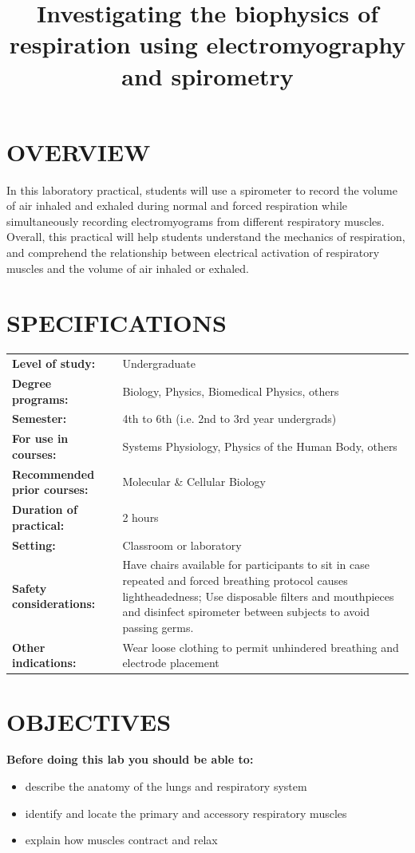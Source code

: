\documentclass[12pt]{article}
\title{\vspace{-1.8cm}\Large{\textbf{Investigating the biophysics of respiration using electromyography and spirometry}}}
\author{}
\date{}
\begin{document}
\maketitle

\vspace{-1.4cm}

\section*{OVERVIEW}

In this laboratory practical, students will use a spirometer to record the volume of air inhaled and exhaled during normal and forced respiration while simultaneously recording electromyograms from different respiratory muscles. Overall, this practical will help students understand the mechanics of respiration, and comprehend the relationship between electrical activation of respiratory muscles and the volume of air inhaled or exhaled.

\section*{SPECIFICATIONS}
\begin{tabular}{p{6cm} p{10cm}}
\textbf{Level of study:} & Undergraduate \\
\textbf{Degree programs:} & Biology, Physics, Biomedical Physics, others \\
\textbf{Semester:} & 4th to 6th (i.e. 2nd to 3rd year undergrads) \\ 
\textbf{For use in courses:} & Systems Physiology, Physics of the Human Body, others \\
\textbf{Recommended prior courses:} & Molecular \& Cellular Biology \\
\textbf{Duration of practical:} & 2 hours \\
\textbf{Setting:} & Classroom or laboratory \\
\textbf{Safety considerations:} & Have chairs available for participants to sit in case repeated and forced breathing protocol causes lightheadedness; Use disposable filters and mouthpieces and disinfect spirometer between subjects to avoid passing germs. \\
\textbf{Other indications:} & Wear loose clothing to permit unhindered breathing and electrode placement
\end{tabular}

\section*{OBJECTIVES}
\textbf{Before doing this lab you should be able to:}
\begin{itemize}
\item describe the anatomy of the lungs and respiratory system
\item identify and locate the primary and accessory respiratory muscles 
\item explain how muscles contract and relax
\end{itemize}
 
\end{document}
